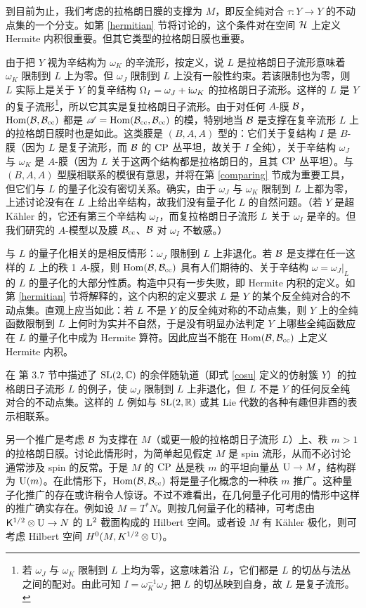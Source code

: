到目前为止，我们考虑的拉格朗日膜的支撑为 $M$，即反全纯对合 $\tau:Y\to Y$ 的不动点集的一个分支。如第 \ref{hermitian} 节将讨论的，这个条件对在空间 ${\mathcal H}$ 上定义 Hermite 内积很重要。但其它类型的拉格朗日膜也重要。

由于把 $Y$ 视为辛结构为 $\omega_K$ 的辛流形，按定义，说 $L$ 是拉格朗日子流形意味着 $\omega_K$ 限制到 $L$ 上为零。但 $\omega_J$ 限制到 $L$ 上没有一般性约束。若该限制也为零，则 $L$ 实际上是关于 $Y$ 的复辛结构 $\Omega_I=\omega_J+{\mathrm i}\omega_K$ 的拉格朗日子流形。这样的 $L$ 是 $Y$ 的复子流形\footnote{若 $\omega_J$ 与 $\omega_K$ 限制到 $L$ 上均为零，这意味着沿 $L$，它们都是 $L$ 的切丛与法丛之间的配对。由此可知 $I=\omega_K^{-1}\omega_J$ 把 $L$ 的切丛映到自身，故 $L$ 是复子流形。}，所以它其实是复拉格朗日子流形。由于对任何 $A$-膜 ${\mathcal B}$，${\mathrm{Hom}}({\mathcal B},{\mathcal B}_{\mathrm{cc}})$ 都是 ${\mathscr A}={\mathrm{Hom}}({\mathcal B}_{\mathrm{cc}},{\mathcal B}_{\mathrm{cc}})$ 的模，特别地当 ${\mathcal B}$ 是支撑在复辛流形 $L$ 上的拉格朗日膜时也是如此。这类膜是 $(B,A,A)$ 型的：它们关于复结构 $I$ 是 $B$-膜（因为 $L$ 是复子流形，而 ${\mathcal B}$ 的 ${\mathrm{CP}}$ 丛平坦，故关于 $I$ 全纯），关于辛结构 $\omega_J$ 与 $\omega_K$ 是 $A$-膜（因为 $L$ 关于这两个结构都是拉格朗日的，且其 ${\mathrm{CP}}$ 丛平坦）。与 $(B,A,A)$ 型膜相联系的模很有意思，并将在第 \ref{comparing} 节成为重要工具，但它们与 $L$ 的量子化没有密切关系。确实，由于 $\omega_J$ 与 $\omega_K$ 限制到 $L$ 上都为零，上述讨论没有在 $L$ 上给出辛结构，故我们没有量子化 $L$ 的自然问题。（若 $Y$ 是超 Kähler 的，它还有第三个辛结构 $\omega_I$，而复拉格朗日子流形 $L$ 关于 $\omega_I$ 是辛的。但我们研究的 $A$-模型以及膜 ${\mathcal B}_{\mathrm{cc}}$、${\mathcal B}$ 对 $\omega_I$ 不敏感。）

与 $L$ 的量子化相关的是相反情形：$\omega_J$ 限制到 $L$ 上非退化。若 ${\mathcal B}$ 是支撑在任一这样的 $L$ 上的秩 1 $A$-膜，则 ${\mathrm{Hom}}({\mathcal B},{\mathcal B}_{\mathrm{cc}})$ 具有人们期待的、关于辛结构 $\omega=\omega_J|_L$ 的 $L$ 的量子化的大部分性质。构造中只有一步失败，即 Hermite 内积的定义。如第 \ref{hermitian} 节将解释的，这个内积的定义要求 $L$ 是 $Y$ 的某个反全纯对合的不动点集。直观上应当如此：若 $L$ 不是 $Y$ 的反全纯对称的不动点集，则 $Y$ 上的全纯函数限制到 $L$ 上何时为实并不自然，于是没有明显办法判定 $Y$ 上哪些全纯函数应在 $L$ 的量子化中成为 Hermite 算符。因此应当不能在 ${\mathrm{Hom}}({\mathcal B},{\mathcal B}_{\mathrm{cc}})$ 上定义 Hermite 内积。

在 \cite{GW} 第 3.7 节中描述了 ${\mathrm{SL}}(2,{\mathbb C})$ 的余伴随轨道（即式 \eqref{cosu} 定义的仿射簇 $Y$）的拉格朗日子流形 $L$ 的例子，使 $\omega_J$ 限制到 $L$ 上非退化，但 $L$ 不是 $Y$ 的任何反全纯对合的不动点集。这样的 $L$ 例如与 ${\mathrm{SL}}(2,{\mathbb R})$ 或其 Lie 代数的各种有趣但非酉的表示相联系。

另一个推广是考虑 ${\mathcal B}$ 为支撑在 $M$（或更一般的拉格朗日子流形 $L$）上、秩 $m>1$ 的拉格朗日膜。讨论此情形时，为简单起见假定 $M$ 是 spin 流形，从而不必讨论通常涉及 spin 的反常。于是 $M$ 的 ${\mathrm{CP}}$ 丛是秩 $m$ 的平坦向量丛 ${\mathrm U}\to M$，结构群为 ${\mathrm U}(m)$。在此情形下，${\mathrm{Hom}}({\mathcal B},{\mathcal B}_{\mathrm{cc}})$ 将是量子化概念的一种秩 $m$ 推广。这种量子化推广的存在或许稍令人惊讶。不过不难看出，在几何量子化可用的情形中这样的推广确实存在。例如设 $M=T^*N$。则按几何量子化的精神，可考虑由 ${\sf K}^{1/2}\otimes{\mathrm U}\to N$ 的 ${\mathrm L}^2$ 截面构成的 Hilbert 空间。或者设 $M$ 有 Kähler 极化，则可考虑 Hilbert 空间 $H^0(M,K^{1/2}\otimes{\mathrm U})$。
